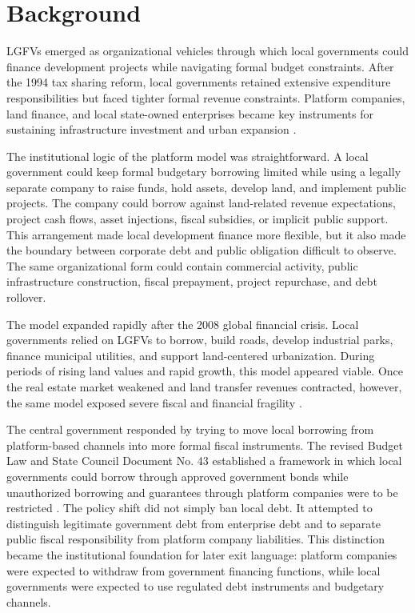 \section{Background}

LGFVs emerged as organizational vehicles through which local governments could
finance development projects while navigating formal budget constraints. After
the 1994 tax sharing reform, local governments retained extensive expenditure
responsibilities but faced tighter formal revenue constraints. Platform
companies, land finance, and local state-owned enterprises became key
instruments for sustaining infrastructure investment and urban expansion
\citep{oi1992,montinola1995,jin2005,wong2013}.

The institutional logic of the platform model was straightforward. A local
government could keep formal budgetary borrowing limited while using a legally
separate company to raise funds, hold assets, develop land, and implement public
projects. The company could borrow against land-related revenue expectations,
project cash flows, asset injections, fiscal subsidies, or implicit public
support. This arrangement made local development finance more flexible, but it
also made the boundary between corporate debt and public obligation difficult
to observe. The same organizational form could contain commercial activity,
public infrastructure construction, fiscal prepayment, project repurchase, and
debt rollover.

The model expanded rapidly after the 2008 global financial crisis. Local
governments relied on LGFVs to borrow, build roads, develop industrial parks,
finance municipal utilities, and support land-centered urbanization. During
periods of rising land values and rapid growth, this model appeared viable.
Once the real estate market weakened and land transfer revenues contracted,
however, the same model exposed severe fiscal and financial fragility
\citep{tsui2011,bai2016longshadow}.

The central government responded by trying to move local borrowing from
platform-based channels into more formal fiscal instruments. The revised Budget
Law and State Council Document No. 43 established a framework in which local
governments could borrow through approved government bonds while unauthorized
borrowing and guarantees through platform companies were to be restricted
\citep{budgetlaw2014,statecouncil2014}. The policy shift did not simply ban
local debt. It attempted to distinguish legitimate government debt from
enterprise debt and to separate public fiscal responsibility from platform
company liabilities. This distinction became the institutional foundation for
later exit language: platform companies were expected to withdraw from
government financing functions, while local governments were expected to use
regulated debt instruments and budgetary channels.

